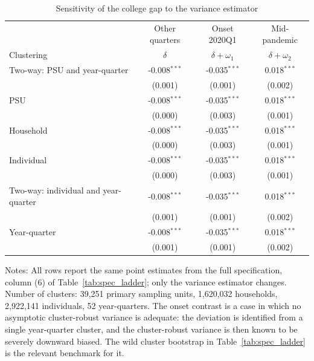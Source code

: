 \begin{table}[H]
\centering
\caption{Sensitivity of the college gap to the variance estimator}
\label{tab:vcov}
\begin{threeparttable}
\begin{tabular}{lccc}
\toprule
& Other quarters & Onset 2020Q1 & Mid-pandemic \\
Clustering & $\delta$ & $\delta+\omega_1$ & $\delta+\omega_2$ \\
\midrule
Two-way: PSU and year-quarter & -0.008$^{***}$ & -0.035$^{***}$ & 0.018$^{***}$ \\
 & (0.001) & (0.001) & (0.002) \\
PSU & -0.008$^{***}$ & -0.035$^{***}$ & 0.018$^{***}$ \\
 & (0.000) & (0.003) & (0.001) \\
Household & -0.008$^{***}$ & -0.035$^{***}$ & 0.018$^{***}$ \\
 & (0.000) & (0.003) & (0.001) \\
Individual & -0.008$^{***}$ & -0.035$^{***}$ & 0.018$^{***}$ \\
 & (0.000) & (0.003) & (0.001) \\
Two-way: individual and year-quarter & -0.008$^{***}$ & -0.035$^{***}$ & 0.018$^{***}$ \\
 & (0.001) & (0.001) & (0.002) \\
Year-quarter & -0.008$^{***}$ & -0.035$^{***}$ & 0.018$^{***}$ \\
 & (0.001) & (0.001) & (0.002) \\
\bottomrule
\end{tabular}
\begin{tablenotes}[flushleft]\footnotesize
\item Notes: All rows report the same point estimates from the full specification, column (6) of Table~\ref{tab:spec_ladder}; only the variance estimator changes. Number of clusters: 39,251 primary sampling units, 1,620,032 households, 2,922,141 individuals, 52 year-quarters. The onset contrast is a case in which no asymptotic cluster-robust variance is adequate: the deviation is identified from a single year-quarter cluster, and the cluster-robust variance is then known to be severely downward biased. The wild cluster bootstrap in Table~\ref{tab:spec_ladder} is the relevant benchmark for it.
\end{tablenotes}
\end{threeparttable}
\end{table}
